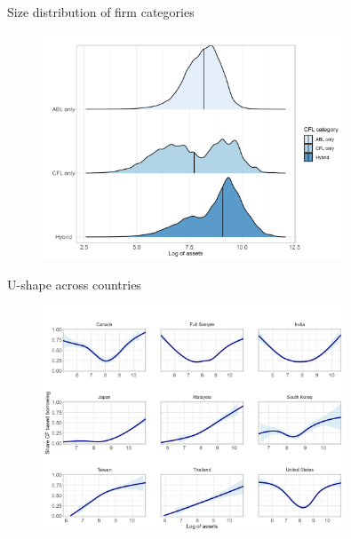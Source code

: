 \documentclass[notes]{beamer}
\begin{document}
\begin{frame}[label=distrib]{Size distribution of firm categories}
\begin{figure}[H]  %
    \centering
    \includegraphics[width=0.8\textwidth]{ridges.png}
\end{figure}
\begin{center}
\hyperlink{slide2}{}
\end{center}
\end{frame}

\begin{frame}[label=U_country]{U-shape across countries}
\begin{figure}[H]  %
    \centering
    \includegraphics[width=0.8\textwidth]{presentations/smoothy_country.png}
\end{figure}
\begin{center}
\hyperlink{slide3}{}
\end{center}
\end{frame}
\end{document}
